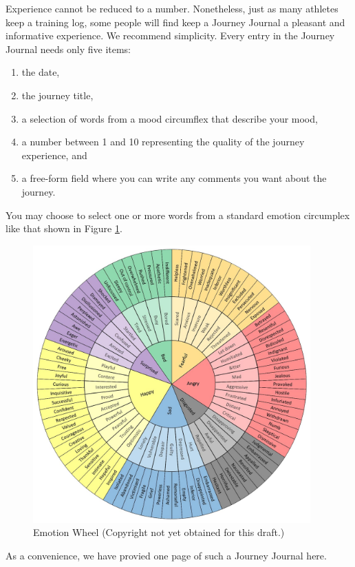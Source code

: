\documentclass[12pt]{book}
\begin{document}
Experience cannot be reduced to a number.  Nonetheless, just
as many athletes keep a training log, some people will find
keep a Journey Journal a pleasant and informative experience.
We recommend simplicity. Every entry in the Journey Journal
needs only five items:
\begin{enumerate}
\item the date,
\item the journey title,
\item a selection of words from a mood circumflex that
  describe your mood,
\item a number between 1 and 10 representing the quality of
  the journey experience, and
\item a free-form field where you can write any comments
  you want about the journey.
\end{enumerate}

You may choose to select one or more words from a standard
emotion circumplex like that shown in Figure \ref{fig:emotionwheel}.
\begin{figure}
  \centering
     \includegraphics[width=0.95\textwidth]{WacuriFigures/EmotionWheel.jpg}
     \caption{Emotion Wheel (Copyright not yet obtained for this draft.)}
  \label{fig:emotionwheel}     
\end{figure}


As a convenience, we have provied one page of such a Journey Journal here.
\end{document}
